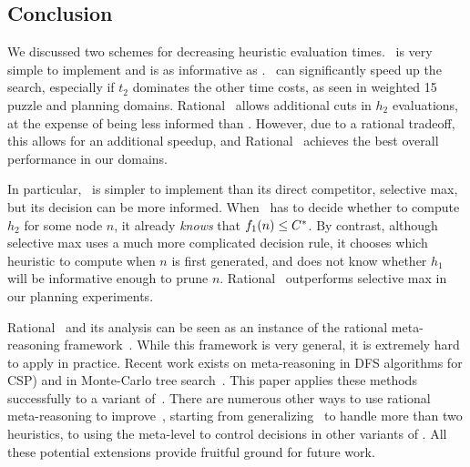 \subsection{Conclusion}

We discussed two schemes for decreasing heuristic evaluation times. \lazyastar~is very simple to implement
and is as informative as \astarmax. \lazyastar~can significantly speed up the search, especially if $t_2$ dominates
the other time costs, as seen in weighted 15 puzzle and planning domains.
Rational \lazyastar~allows additional cuts in $h_2$ evaluations, at the expense
of being less informed than \astarmax. However, due to a rational tradeoff, this
allows for an additional speedup, and Rational \lazyastar~achieves the best
overall performance in our domains.

In particular, \rationallazyastar~is simpler to implement than its direct
competitor, selective max, but its decision can be more informed.  When
\rationallazyastar~has to decide whether to compute $h_2$ for some node
$n$, it already {\em knows} that $f_1(n) \leq C^\ast$.  By contrast,
although selective max uses a much more complicated decision rule, it
chooses which heuristic to compute when $n$ is first generated, and does
not know whether $h_1$ will be informative enough to prune $n$. Rational
\lazyastar~outperforms selective max in our planning experiments.

Rational \lazyastar~and its analysis can be seen as an instance of the
rational meta-reasoning framework~\cite{Russell.right}. While
this framework is very general, it is extremely hard to
apply in practice. Recent work exists on meta-reasoning in DFS
algorithms for CSP) \cite{TolpinShimony.csp} and in Monte-Carlo tree
search~\cite{HayRussellTolpinShimony.selecting}. This paper applies these
methods successfully to a variant of~\astar.  There are numerous other
ways to use rational meta-reasoning to improve~\astar, starting from
generalizing \rationallazyastar~to handle more than two heuristics, to
using the meta-level to control decisions in other variants of \astar. All
these potential extensions provide fruitful ground for future work.
